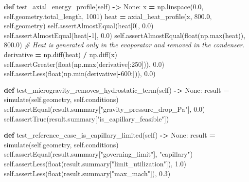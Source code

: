 \documentclass[
  12pt,a4paper,oneside]{report}
\newenvironment{Shaded}{\begin{snugshade}}{\end{snugshade}}
\newcommand{\BuiltInTok}[1]{#1}
\newcommand{\CommentTok}[1]{\textcolor[rgb]{0.56,0.35,0.01}{\textit{#1}}}
\newcommand{\DecValTok}[1]{\textcolor[rgb]{0.00,0.00,0.81}{#1}}
\newcommand{\FloatTok}[1]{\textcolor[rgb]{0.00,0.00,0.81}{#1}}
\newcommand{\KeywordTok}[1]{\textcolor[rgb]{0.13,0.29,0.53}{\textbf{#1}}}
\newcommand{\NormalTok}[1]{#1}
\newcommand{\OperatorTok}[1]{\textcolor[rgb]{0.81,0.36,0.00}{\textbf{#1}}}
\newcommand{\StringTok}[1]{\textcolor[rgb]{0.31,0.60,0.02}{#1}}
\newcommand{\VariableTok}[1]{\textcolor[rgb]{0.00,0.00,0.00}{#1}}
\begin{document}
\begin{Shaded}
\begin{Highlighting}[]
    \KeywordTok{def}\NormalTok{ test\_axial\_energy\_profile(}\VariableTok{self}\NormalTok{) }\OperatorTok{{-}\textgreater{}} \VariableTok{None}\NormalTok{:}
\NormalTok{        x }\OperatorTok{=}\NormalTok{ np.linspace(}\FloatTok{0.0}\NormalTok{, }\VariableTok{self}\NormalTok{.geometry.total\_length, }\DecValTok{1001}\NormalTok{)}
\NormalTok{        heat }\OperatorTok{=}\NormalTok{ axial\_heat\_profile(x, }\FloatTok{800.0}\NormalTok{, }\VariableTok{self}\NormalTok{.geometry)}
        \VariableTok{self}\NormalTok{.assertAlmostEqual(heat[}\DecValTok{0}\NormalTok{], }\FloatTok{0.0}\NormalTok{)}
        \VariableTok{self}\NormalTok{.assertAlmostEqual(heat[}\OperatorTok{{-}}\DecValTok{1}\NormalTok{], }\FloatTok{0.0}\NormalTok{)}
        \VariableTok{self}\NormalTok{.assertAlmostEqual(}\BuiltInTok{float}\NormalTok{(np.}\BuiltInTok{max}\NormalTok{(heat)), }\FloatTok{800.0}\NormalTok{)}
        \CommentTok{\# Heat is generated only in the evaporator and removed in the condenser.}
\NormalTok{        derivative }\OperatorTok{=}\NormalTok{ np.diff(heat) }\OperatorTok{/}\NormalTok{ np.diff(x)}
        \VariableTok{self}\NormalTok{.assertGreater(}\BuiltInTok{float}\NormalTok{(np.}\BuiltInTok{max}\NormalTok{(derivative[:}\DecValTok{250}\NormalTok{])), }\FloatTok{0.0}\NormalTok{)}
        \VariableTok{self}\NormalTok{.assertLess(}\BuiltInTok{float}\NormalTok{(np.}\BuiltInTok{min}\NormalTok{(derivative[}\OperatorTok{{-}}\DecValTok{600}\NormalTok{:])), }\FloatTok{0.0}\NormalTok{)}

    \KeywordTok{def}\NormalTok{ test\_microgravity\_removes\_hydrostatic\_term(}\VariableTok{self}\NormalTok{) }\OperatorTok{{-}\textgreater{}} \VariableTok{None}\NormalTok{:}
\NormalTok{        result }\OperatorTok{=}\NormalTok{ simulate(}\VariableTok{self}\NormalTok{.geometry, }\VariableTok{self}\NormalTok{.conditions)}
        \VariableTok{self}\NormalTok{.assertEqual(result.summary[}\StringTok{"gravity\_pressure\_drop\_Pa"}\NormalTok{], }\FloatTok{0.0}\NormalTok{)}
        \VariableTok{self}\NormalTok{.assertTrue(result.summary[}\StringTok{"is\_capillary\_feasible"}\NormalTok{])}

    \KeywordTok{def}\NormalTok{ test\_reference\_case\_is\_capillary\_limited(}\VariableTok{self}\NormalTok{) }\OperatorTok{{-}\textgreater{}} \VariableTok{None}\NormalTok{:}
\NormalTok{        result }\OperatorTok{=}\NormalTok{ simulate(}\VariableTok{self}\NormalTok{.geometry, }\VariableTok{self}\NormalTok{.conditions)}
        \VariableTok{self}\NormalTok{.assertEqual(result.summary[}\StringTok{"governing\_limit"}\NormalTok{], }\StringTok{"capillary"}\NormalTok{)}
        \VariableTok{self}\NormalTok{.assertLess(}\BuiltInTok{float}\NormalTok{(result.summary[}\StringTok{"limit\_utilization"}\NormalTok{]), }\FloatTok{1.0}\NormalTok{)}
        \VariableTok{self}\NormalTok{.assertLess(}\BuiltInTok{float}\NormalTok{(result.summary[}\StringTok{"max\_mach"}\NormalTok{]), }\FloatTok{0.3}\NormalTok{)}


\end{Highlighting}
\end{Shaded}
\end{document}
